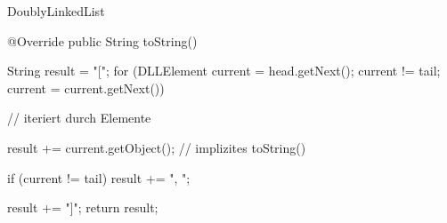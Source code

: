 \resetframecounters
\begin{frame}[fragile]{DoublyLinkedList}
    \begin{solve}
    \begin{plainjava}
@Override
public String toString() {
    String result = "[";
    for (DLLElement current = head.getNext(); current != tail; current = current.getNext()) { // iteriert durch Elemente

            result += current.getObject(); // implizites toString()

            if (current != tail) result += ", ";
    }
    result += "]";
    return result;
}
    \end{plainjava}
    \end{solve}
\end{frame}